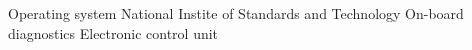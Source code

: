 		{Operating system}
		{National Instite of Standards and Technology}
		{On-board diagnostics}
		{Electronic control unit}